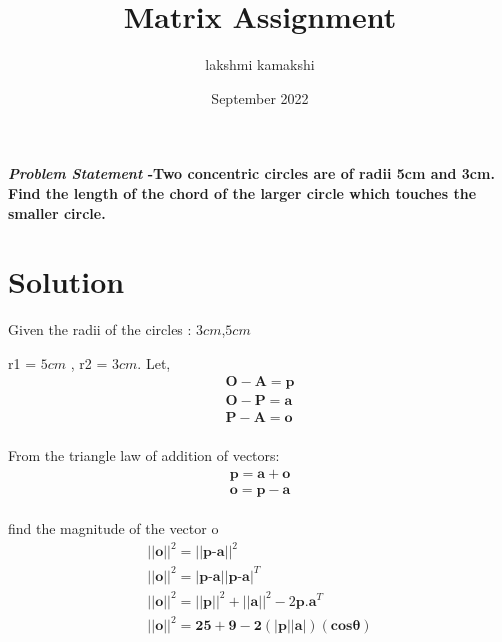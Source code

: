 \documentclass[journal,10pt,twocolumn]{article}
\title{\textbf{Matrix Assignment}}
\author{lakshmi kamakshi}
\date{September 2022}
\begin{document}
\maketitle
\paragraph{\textit{Problem Statement} -Two concentric circles are of radii 5cm and 3cm. Find the length of the chord of the larger circle which touches the smaller circle.}
\vspace{5mm}

\section*{Solution}

Given the radii of the circles : $3cm$,$5cm$

 r1 = $5cm$ , r2 = $3cm$.
Let,
\begin{eqnarray}
	\boldsymbol{O}-\boldsymbol{A} = \boldsymbol{p}
\\	\boldsymbol{O}-\boldsymbol{P} = \boldsymbol{a}
\\	\boldsymbol{P}-\boldsymbol{A} = \boldsymbol{o}
\end{eqnarray}
\\ From the triangle law of addition of vectors:
\begin{eqnarray}
 \boldsymbol{p} = \boldsymbol{a} + \boldsymbol{o}
\\ \boldsymbol{o} = \boldsymbol{p} - \boldsymbol{a}
\end{eqnarray}
\\ find the magnitude of the vector o 
	\begin{eqnarray}
		||\textbf{o}||^2 = ||\textbf{p-a}||^2
		\\	||\textbf{o}||^2 = |\textbf{p-a}||\textbf{p-a}|^T
		\\||\textbf{o}||^2 = ||\textbf{p}||^2+||\textbf{a}||^2-2\textbf{p.a}^T
		\\ ||\boldsymbol{o}||^2 = \boldsymbol{25 + 9 -2(|\textbf{p}||\textbf{a}|)(cos\theta)}
\end{eqnarray}
\end{document}
